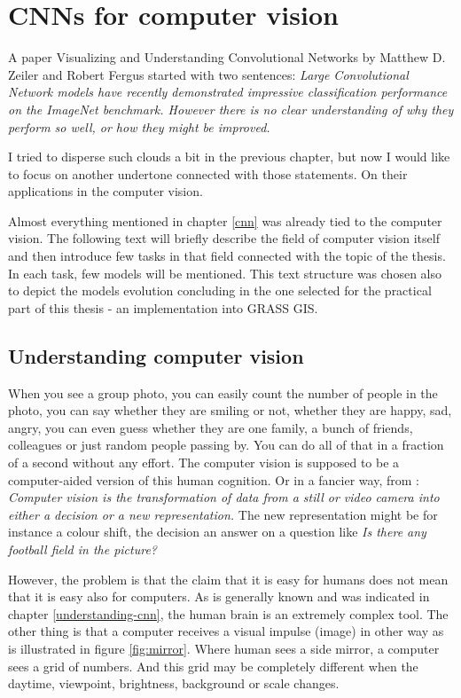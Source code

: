 \chapter{CNNs for computer vision}
\label{image-ann}

A paper Visualizing and Understanding Convolutional Networks by Matthew D. Zeiler and Robert Fergus \cite{zf-net} started with two sentences: \textit{Large Convolutional Network models have recently demonstrated impressive classification performance on the ImageNet benchmark. However there is no clear understanding of why they perform so well, or how they might be improved.}

I tried to disperse such clouds a bit in the previous chapter, but now I would like to focus on another undertone connected with those statements. On their applications in the computer vision.

Almost everything mentioned in chapter \ref{cnn} was already tied to the computer vision. The following text will briefly describe the field of computer vision itself and then introduce few tasks in that field connected with the topic of the thesis. In each task, few  models will be mentioned. This text structure was chosen also to depict the models evolution concluding in the one selected for the practical part of this thesis - an implementation into GRASS GIS.


\section{Understanding computer vision}
\label{computer-vision}

When you see a group photo, you can easily count the number of people in the photo, you can say whether they are smiling or not, whether they are happy, sad, angry, you can even guess whether they are one family, a bunch of friends, colleagues or just random people passing by. You can do all of that in a fraction of a second without any effort. The computer vision is supposed to be a computer-aided version of this human cognition. Or in a fancier way, from \cite{opencv}: \textit{Computer vision is the transformation of data from a still or video camera into either a decision or a new representation.} The new representation might be for instance a colour shift, the decision an answer on a question like \textit{Is there any football field in the picture?}

However, the problem is that the claim that it is easy for humans does not mean that it is easy also for computers. As is generally known and was indicated in chapter \ref{understanding-cnn}, the human brain is an extremely complex tool. The other thing is that a computer receives a visual impulse (image) in other way as is illustrated in figure \ref{fig:mirror}. Where human sees a side mirror, a computer sees a grid of numbers. And this grid may be completely different when the daytime, viewpoint, brightness, background or scale changes.

